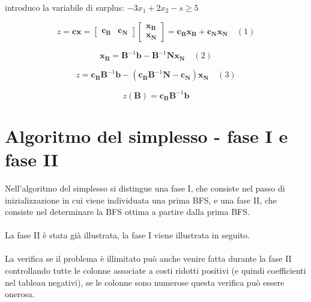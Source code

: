 \documentclass[a4paper, 11pt]{article}
\begin{document}
                introduco la variabile di surplus: $-3x_1+2x_2 - s \geq 5$


                \[
                z = \mathbf{cx} = \begin{bmatrix} \mathbf{c_B} & \mathbf{c_N} \end{bmatrix} 
                \begin{bmatrix} \mathbf{x_B} \\ \mathbf{x_N} \end{bmatrix} = 
                \mathbf{c_B x_B} + \mathbf{c_N x_N} \quad (1)
                \]
                
                \[
                \mathbf{x_B} = \mathbf{B}^{-1} \mathbf{b} - \mathbf{B}^{-1} \mathbf{N x_N} \quad (2)
                \]


                \[
                z = \mathbf{c_B B}^{-1} \mathbf{b} - 
                \left( \mathbf{c_B B}^{-1} \mathbf{N} - \mathbf{c_N} \right) \mathbf{x_N} \quad (3)
                \]

                \[
                z(\mathbf{B}) = \mathbf{c_B B}^{-1} \mathbf{b}
                \]






                








            
        \section{Algoritmo del simplesso - fase I e fase II}
        Nell’algoritmo del simplesso si distingue una fase I, che consiste nel passo di inizializzazione in cui viene individuata una prima BFS, e una fase II, che consiste nel determinare la BFS ottima a partire dalla prima BFS.

        \paragraph{}
        La fase II è stata già illustrata, la fase I viene illustrata in seguito.

        \paragraph{}
        La verifica se il problema è illimitato può anche venire fatta durante la fase II controllando tutte le colonne associate a costi ridotti positivi (e quindi coefficienti nel tableau negativi), se le
        colonne sono numerose questa verifica può essere onerosa.
\end{document}
